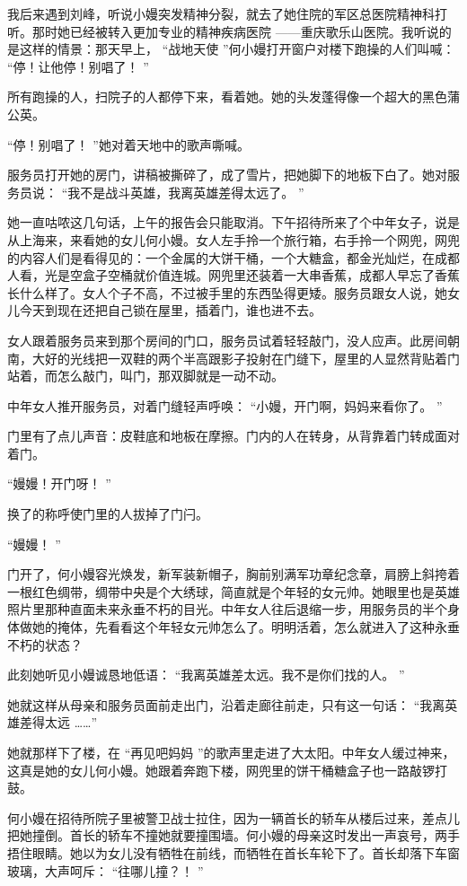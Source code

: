 \documentclass[12pt,twoside,openany]{book}
\begin{document}
我后来遇到刘峰，听说小嫚突发精神分裂，就去了她住院的军区总医院精神科打听。那时她已经被转入更加专业的精神疾病医院 ——重庆歌乐山医院。我听说的是这样的情景：那天早上， “战地天使 ”何小嫚打开窗户对楼下跑操的人们叫喊： “停！让他停！别唱了！ ”

所有跑操的人，扫院子的人都停下来，看着她。她的头发蓬得像一个超大的黑色蒲公英。

“停！别唱了！ ”她对着天地中的歌声嘶喊。

服务员打开她的房门，讲稿被撕碎了，成了雪片，把她脚下的地板下白了。她对服务员说： “我不是战斗英雄，我离英雄差得太远了。 ”

她一直咕哝这几句话，上午的报告会只能取消。下午招待所来了个中年女子，说是从上海来，来看她的女儿何小嫚。女人左手拎一个旅行箱，右手拎一个网兜，网兜的内容人们是看得见的：一个金属的大饼干桶，一个大糖盒，都金光灿烂，在成都人看，光是空盒子空桶就价值连城。网兜里还装着一大串香蕉，成都人早忘了香蕉长什么样了。女人个子不高，不过被手里的东西坠得更矮。服务员跟女人说，她女儿今天到现在还把自己锁在屋里，插着门，谁也进不去。

女人跟着服务员来到那个房间的门口，服务员试着轻轻敲门，没人应声。此房间朝南，大好的光线把一双鞋的两个半高跟影子投射在门缝下，屋里的人显然背贴着门站着，而怎么敲门，叫门，那双脚就是一动不动。

中年女人推开服务员，对着门缝轻声呼唤： “小嫚，开门啊，妈妈来看你了。 ”

门里有了点儿声音：皮鞋底和地板在摩擦。门内的人在转身，从背靠着门转成面对着门。

“嫚嫚！开门呀！ ”

换了的称呼使门里的人拔掉了门闩。

“嫚嫚！ ”

门开了，何小嫚容光焕发，新军装新帽子，胸前别满军功章纪念章，肩膀上斜挎着一根红色绸带，绸带中央是个大绣球，简直就是个年轻的女元帅。她眼里也是英雄照片里那种直面未来永垂不朽的目光。中年女人往后退缩一步，用服务员的半个身体做她的掩体，先看看这个年轻女元帅怎么了。明明活着，怎么就进入了这种永垂不朽的状态？

此刻她听见小嫚诚恳地低语： “我离英雄差太远。我不是你们找的人。 ”

她就这样从母亲和服务员面前走出门，沿着走廊往前走，只有这一句话： “我离英雄差得太远 ……”

她就那样下了楼，在 “再见吧妈妈 ”的歌声里走进了大太阳。中年女人缓过神来，这真是她的女儿何小嫚。她跟着奔跑下楼，网兜里的饼干桶糖盒子也一路敲锣打鼓。

何小嫚在招待所院子里被警卫战士拉住，因为一辆首长的轿车从楼后过来，差点儿把她撞倒。首长的轿车不撞她就要撞围墙。何小嫚的母亲这时发出一声哀号，两手捂住眼睛。她以为女儿没有牺牲在前线，而牺牲在首长车轮下了。首长却落下车窗玻璃，大声呵斥： “往哪儿撞？！ ”
\end{document}
